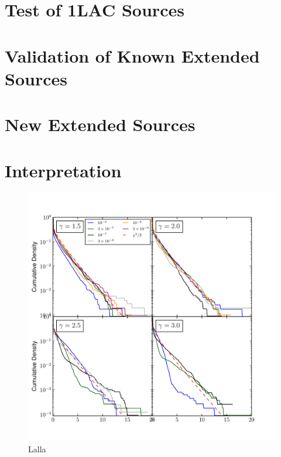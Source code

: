 \documentclass{emulateapj}
\begin{document}


\section{Test of 1LAC Sources}

\section{Validation of Known Extended Sources}

\section{New Extended Sources}

\section{Interpretation}

\begin{figure}
  \begin{center}
    \includegraphics{mc_plots/ts_ext_emin_1000.pdf}
    \end{center}
    \caption{Lalla}\label{ts_ext}
  \end{figure}
\end{document}
